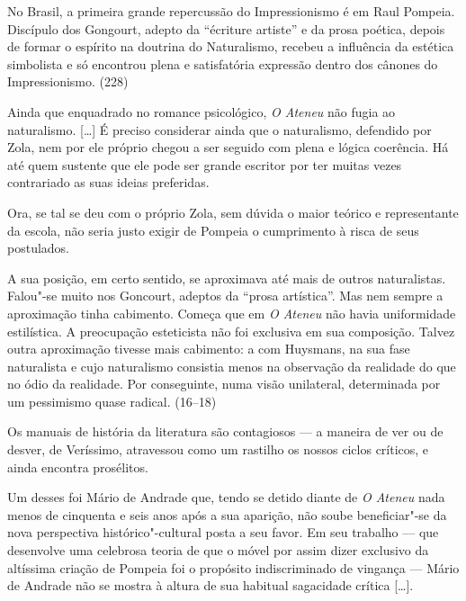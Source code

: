 No Brasil, a primeira grande repercussão do Impressionismo é em Raul
Pompeia. Discípulo dos Gongourt, adepto da ``écriture artiste'' e da
prosa poética, depois de formar o espírito na doutrina do Naturalismo,
recebeu a influência da estética simbolista e só encontrou plena e
satisfatória expressão dentro dos cânones do Impressionismo. (228)



Ainda que enquadrado no romance psicológico,
\textit{O Ateneu} não fugia ao naturalismo.
[\ldots] É preciso considerar ainda que o naturalismo, defendido por Zola,
nem por ele próprio chegou a ser seguido com plena e lógica coerência.
Há até quem sustente que ele pode ser grande escritor por ter muitas
vezes contrariado as suas ideias preferidas.

Ora, se tal se deu com o próprio Zola, sem dúvida o maior teórico e
representante da escola, não seria justo exigir de Pompeia o
cumprimento à risca de seus postulados.

A sua posição, em certo sentido, se aproximava até mais
de outros naturalistas. Falou"-se muito nos Goncourt, adeptos da
``prosa artística''. Mas nem sempre a aproximação tinha cabimento. Começa
que em \textit{O Ateneu} não havia uniformidade estilística. A preocupação esteticista não foi exclusiva
em sua composição. Talvez outra aproximação tivesse mais cabimento: a
com Huysmans, na sua fase naturalista e cujo naturalismo consistia
menos na observação da realidade do que no ódio da realidade. Por
conseguinte, numa visão unilateral, determinada por um pessimismo quase
radical. (16--18)



Os manuais de história da literatura são contagiosos --- a maneira de ver
ou de desver, de Veríssimo, atravessou como um rastilho os nossos
ciclos críticos, e ainda encontra prosélitos.

Um desses foi Mário de Andrade que, tendo se detido
diante de \textit{O Ateneu} nada menos de
cinquenta e seis anos após a sua aparição, não soube beneficiar"-se da
nova perspectiva histórico"-cultural posta a seu favor. Em seu
trabalho --- que desenvolve uma celebrosa teoria de que o móvel por assim
dizer exclusivo da altíssima criação de Pompeia foi o propósito
indiscriminado de vingança --- Mário de Andrade não se mostra à altura de
sua habitual sagacidade crítica [\ldots].

